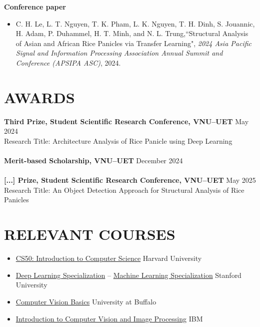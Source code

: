 \documentclass[a4paper,9pt]{extarticle}
\newcommand{\colormyname}[1]{\textcolor{myred}{#1}}
\begin{document}
\noindent
\textbf{Conference paper}
\begin{itemize}
    \item C. H. Le, \colormyname{L. T. Nguyen}, T. K. Pham, L. K. Nguyen, T. H. Dinh, S. Jouannic, H. Adam, P. Duhammel, H. T. Minh, and N. L. Trung,``Structural Analysis of Asian and African Rice Panicles via Transfer Learning", \textit{2024 Asia Pacific Signal and Information Processing Association Annual Summit and Conference (APSIPA ASC)}, 2024.
\end{itemize}

\section*{AWARDS}
\textbf{Third Prize, Student Scientific Research Conference, VNU--UET} \hfill May 2024\\ 
Research Title: Architecture Analysis of Rice Panicle using Deep Learning \\ \\
\textbf{Merit-based Scholarship, VNU--UET} \hfill  December 2024 \\ \\
\textbf{[...] Prize, Student Scientific Research Conference, VNU--UET} \hfill May 2025\\ 
Research Title: An Object Detection Approach for Structural Analysis of Rice Panicles

\section*{RELEVANT COURSES}
\begin{itemize}
    \item \href{https://certificates.cs50.io/3f3f35e9-bda6-4487-84a3-2d11b3706bba.pdf?size=letter}{CS50: Introduction to Computer Science} \hfill Harvard University
    \item \href{https://www.credly.com/badges/6dfef240-b0c0-423f-9c94-897d0940c790/public_url}{Deep Learning Specialization} -- \href{https://www.coursera.org/account/accomplishments/specialization/N234W2TA9VF3}{Machine Learning Specialization} \hfill Stanford University
    \item \href{https://www.coursera.org/account/accomplishments/certificate/L9TKVLPXS79W}{Computer Vision Basics} \hfill University at Buffalo
    \item \href{https://www.credly.com/go/GHFkiYLI}{Introduction to Computer Vision and Image Processing} \hfill IBM
\end{itemize}
\end{document}

